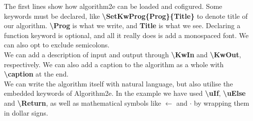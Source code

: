 The first lines show how algorithm2e can be loaded and cofigured. Some keywords must be declared, like \textbf{\textbackslash SetKwProg\{Prog\}\{Title\}} to denote title of our algorithm. \textbf{\textbackslash Prog} is what we write, and \textbf{Title} is what we see. Declaring a function keyword is optional, and all it really does is add a monospaced font. We can also opt to exclude semicolons. \hfill \\

We can add a description of input and output through \textbf{\textbackslash KwIn} and \textbf{\textbackslash KwOut}, respectively. We can also add a caption to the algorithm as a whole with \textbf{\textbackslash caption} at the end. \hfill \\

We can write the algorithm itself with natural language, but also utilise the embedded keywords of Algorithm2e. In the example we have used \textbf{\textbackslash uIf}, \textbf{\textbackslash uElse} and \textbf{\textbackslash Return}, as well as mathematical symbols like $\gets$ and $\cdot$ by wrapping them in dollar signs. \newpage %

